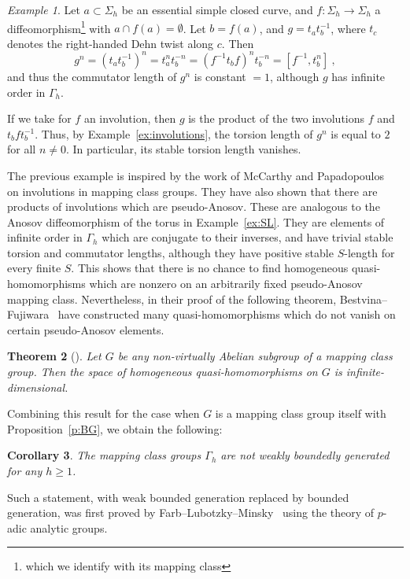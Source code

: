 \documentclass[12pt]{amsart}
\newtheorem{thm}{Theorem}
\newtheorem{cor}[thm]{Corollary}
\theoremstyle{remark}
\newtheorem{ex}[thm]{Example}
\theoremstyle{definition}
\begin{document}
\begin{ex}
    Let $a\subset\Sigma_{h}$ be an essential simple closed curve, and 
    $f\colon\Sigma_{h}\rightarrow\Sigma_{h}$ a diffeomorphism\footnote{which 
    we identify with its mapping class} with $a\cap f(a)=\emptyset$. 
    Let $b=f(a)$, and $g=t_{a}t_{b}^{-1}$, where $t_{c}$ 
    denotes the right-handed Dehn twist along $c$. Then 
    $$
    g^{n}=(t_{a}t_{b}^{-1})^{n}=t_{a}^{n}t_{b}^{-n}=(f^{-1}t_{b}f)^{n}t_{b}^{-n}
    =[f^{-1},t_{b}^{n}] \ ,
    $$
    and thus the commutator length of $g^{n}$ is constant $=1$, 
    although $g$ has infinite order in $\Gamma_{h}$.
    
    If we take for $f$ an involution, then $g$ is the product of the 
    two involutions $f$ and $t_{b}ft_{b}^{-1}$. Thus, by 
    Example~\ref{ex:involutions}, the  torsion length of $g^{n}$ is 
    equal to $2$ for all $n\neq 0$. In particular, its stable torsion 
    length vanishes.
    \end{ex}
The previous example is inspired by the work of McCarthy and Papadopoulos~\cite{MP} 
on involutions in mapping class groups. They have also shown that there are 
products of involutions which are pseudo-Anosov. These are analogous to the 
Anosov diffeomorphism of the torus in Example~\ref{ex:SL}. They are elements of 
infinite order in $\Gamma_{h}$ which are conjugate to their inverses, 
and have trivial stable torsion and commutator lengths, although they 
have positive stable $S$-length for every finite $S$. This shows that 
there is no chance to find homogeneous quasi-homomorphisms which are nonzero on 
an arbitrarily fixed pseudo-Anosov mapping class. Nevertheless, in their proof 
of the following theorem, Bestvina--Fujiwara~\cite{BF} have constructed many 
quasi-homomorphisms which do not vanish on certain pseudo-Anosov elements.
\begin{thm}[\cite{BF}]\label{t:BF}
    Let $G$ be any non-virtually Abelian subgroup of a mapping class 
    group. Then the space of homogeneous quasi-homomorphisms on $G$ is 
    infinite-dimensional.
    \end{thm}
Combining this result for the case when $G$ is a mapping class group 
itself with Proposition~\ref{p:BG}, we obtain the following:
\begin{cor}\label{c:BG}
The mapping class groups $\Gamma_{h}$ are not weakly boundedly 
generated for any $h\geq 1$.
\end{cor}
Such a statement, with weak bounded generation replaced by bounded 
generation, was first proved by Farb--Lubotzky--Minsky~\cite{FLM} 
using the theory of $p$-adic analytic groups.
\end{document}
